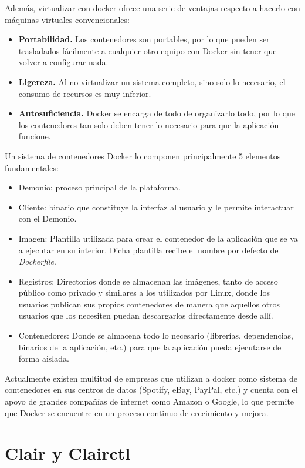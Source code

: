 Además, virtualizar con docker ofrece una serie de ventajas respecto a hacerlo con máquinas virtuales convencionales\cite{velazco2016}:

\begin{itemize}
	\item \textbf{Portabilidad.} Los contenedores son portables, por lo que pueden ser trasladados fácilmente a cualquier otro equipo con Docker sin tener que volver a configurar nada.
	\item \textbf{Ligereza.} Al no virtualizar un sistema completo, sino solo lo necesario, el consumo de recursos es muy inferior.
	\item \textbf{Autosuficiencia.} Docker se encarga de todo de organizarlo todo, por lo que los contenedores tan solo deben tener lo necesario para que la aplicación funcione.
\end{itemize}

Un sistema de contenedores Docker lo componen principalmente 5 elementos fundamentales:

\begin{itemize}
	\item Demonio: proceso principal de la plataforma.
	\item Cliente: binario que constituye la interfaz al usuario y le permite interactuar con el Demonio.
	\item Imagen: Plantilla utilizada para crear el contenedor de la aplicación que se va a ejecutar en su interior. Dicha plantilla recibe el nombre por defecto de \textit{Dockerfile}.
	\item Registros: Directorios donde se almacenan las imágenes, tanto de acceso público como privado y similares a los utilizados por Linux, donde los usuarios publican sus propios contenedores de manera que aquellos otros usuarios que los necesiten puedan descargarlos directamente desde allí.
	\item Contenedores: Donde se almacena todo lo necesario (librerías, dependencias, binarios de la aplicación, etc.) para que la aplicación pueda ejecutarse de forma aislada.
\end{itemize}

Actualmente existen multitud de empresas que utilizan a docker como sistema de contenedores en sus centros de datos (Spotify, eBay, PayPal, etc.) y cuenta con el apoyo de grandes compañías de internet como Amazon o Google, lo que permite que Docker se encuentre en un proceso continuo de crecimiento y mejora.


\section{Clair y Clairctl}

